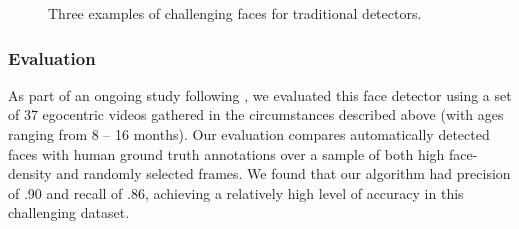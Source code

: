 \documentclass[10pt,letterpaper]{article}
\begin{document}
\begin{figure}[t]
    \caption{Three examples of challenging faces for traditional detectors.}
\label{fig:faces}
\end{figure}

\subsubsection{Evaluation}

As part of an ongoing study following , we evaluated this face detector using a set of 37 egocentric videos gathered in the circumstances described above (with ages ranging from 8 -- 16 months).  Our evaluation compares automatically detected faces with human ground truth annotations over a sample of both high face-density and randomly selected frames. We found that our algorithm had precision of .90 and recall of .86, achieving a relatively high level of accuracy in this challenging dataset. 




\end{document}

